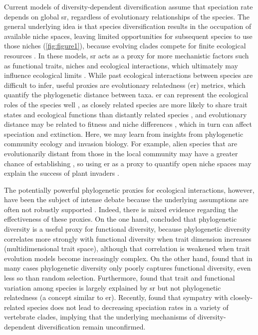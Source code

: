 {Current models of diversity-dependent diversification assume that speciation rate depends on global \acrshort{sr}, regardless of evolutionary relationships of the species. The general underlying idea is that species diversification results in the occupation of available niche spaces, leaving limited opportunities for subsequent species to use those niches (\autoref{fig:figure1}), because evolving clades compete for finite ecological resources \citep{wiens_causes_2011}. In these models, \acrshort{sr} acts as a proxy for more mechanistic factors such as functional traits, niches and ecological interactions, which ultimately may influence ecological limits \citep{srivastava_phylogenetic_2012,kondratyeva_reconciling_2019}. While past ecological interactions between species are difficult to infer, useful proxies are evolutionary relatedness (\acrshort{er}) metrics, which quantify the phylogenetic distance between taxa. \acrshort{er} can represent the ecological roles of the species well \citep{helmus_phylogenetic_2007,pigot_quantifying_2016}, as closely related species are more likely to share trait states and ecological functions than distantly related species \citep{srivastava_phylogenetic_2012}, and evolutionary distance may be related to fitness and niche differences \citep{cadotte_phylogenetic_2012}, which in turn can affect speciation and extinction. Here, we may learn from insights from phylogenetic community ecology \citep{webb_phylogenies_2002, mayfield_opposing_2010, hillerislambers_rethinking_2012} and invasion biology. For example, alien species that are evolutionarily distant from those in the local community may have a greater chance of establishing \citep{zheng_species_2018}, so using \acrshort{er} as a proxy to quantify open niche spaces may explain the success of plant invaders \citep{henn_environmental_2019,qin_phylogenetic_2020}.

The potentially powerful phylogenetic proxies for ecological interactions, however, have been the subject of intense debate because the underlying assumptions are often not robustly supported \citep{gerhold_phylogenetic_2015, pigot_quantifying_2016}. Indeed, there is mixed evidence regarding the effectiveness of these proxies. On the one hand, \citet{tucker_relationship_2018} concluded that phylogenetic diversity is a useful proxy for functional diversity, because phylogenetic diversity correlates more strongly with functional diversity when trait dimension increases (multidimensional trait space), although that correlation is weakened when trait evolution models become increasingly complex. On the other hand, \citet{mazel_prioritizing_2018} found that in many cases phylogenetic diversity only poorly captures functional diversity, even less so than random selection. Furthermore, \citet{venail_species_2015} found that trait and functional variation among species is largely explained by \acrshort{sr} but not phylogenetic relatedness (a concept similar to \acrshort{er}). Recently, \citet{pie_clade_2023} found that sympatry with closely-related species does not lead to decreasing speciation rates in a variety of vertebrate clades, implying that the underlying mechanisms of diversity-dependent diversification remain unconfirmed. 

}
